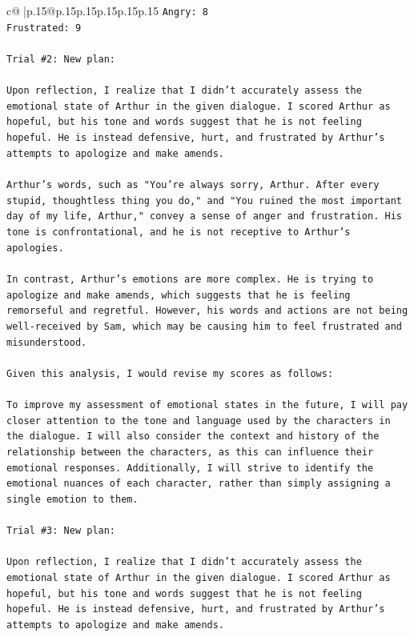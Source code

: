 \documentclass{article}
\begin{document}
{\begin{supertabular}{c@{$\;$}|p{.15\linewidth}@{}p{.15\linewidth}p{.15\linewidth}p{.15\linewidth}p{.15\linewidth}p{.15\linewidth}}
{{{\texttt{Angry: 8} \\
\texttt{Frustrated: 9} \\
\\ 
\texttt{Trial \#2: New plan: } \\
\\ 
\texttt{Upon reflection, I realize that I didn't accurately assess the emotional state of Arthur in the given dialogue. I scored Arthur as hopeful, but his tone and words suggest that he is not feeling hopeful. He is instead defensive, hurt, and frustrated by Arthur's attempts to apologize and make amends. } \\
\\ 
\texttt{Arthur's words, such as "You're always sorry, Arthur. After every stupid, thoughtless thing you do," and "You ruined the most important day of my life, Arthur," convey a sense of anger and frustration. His tone is confrontational, and he is not receptive to Arthur's apologies.} \\
\\ 
\texttt{In contrast, Arthur's emotions are more complex. He is trying to apologize and make amends, which suggests that he is feeling remorseful and regretful. However, his words and actions are not being well{-}received by Sam, which may be causing him to feel frustrated and misunderstood.} \\
\\ 
\texttt{Given this analysis, I would revise my scores as follows:} \\
\\ 
\texttt{To improve my assessment of emotional states in the future, I will pay closer attention to the tone and language used by the characters in the dialogue. I will also consider the context and history of the relationship between the characters, as this can influence their emotional responses. Additionally, I will strive to identify the emotional nuances of each character, rather than simply assigning a single emotion to them.} \\
\\ 
\texttt{Trial \#3: New plan: } \\
\\ 
\texttt{Upon reflection, I realize that I didn't accurately assess the emotional state of Arthur in the given dialogue. I scored Arthur as hopeful, but his tone and words suggest that he is not feeling hopeful. He is instead defensive, hurt, and frustrated by Arthur's attempts to apologize and make amends. } \\
\\ 
}}}
\end{supertabular}}
\end{document}
